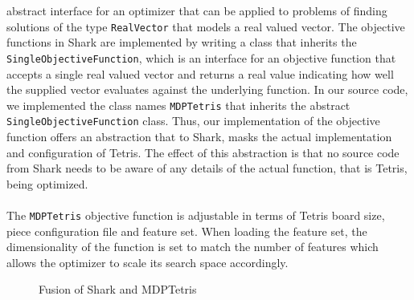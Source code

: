 abstract interface for an optimizer that can be applied to problems of finding 
solutions of the type \lstinline$RealVector$ that models a real valued vector.
The objective functions in Shark are implemented by writing a class that inherits 
the \lstinline$SingleObjectiveFunction$, which is an interface for an objective function 
that accepts a single real valued vector and returns a real value indicating how well the supplied
vector evaluates against the underlying function. In our source code, we implemented the class names 
\lstinline$MDPTetris$ that inherits the abstract \lstinline$SingleObjectiveFunction$ class.
Thus, our implementation of the objective function offers an abstraction that to Shark, masks
the actual implementation and configuration of Tetris. The effect of this abstraction is that 
no source code from Shark needs to be aware of any details of the actual function, that is Tetris, being optimized.\\
\\
The \lstinline$MDPTetris$ objective function is adjustable in terms of Tetris board size, piece 
configuration file and feature set. When loading the feature set, the dimensionality of 
the function is set to match the number of features which allows the optimizer to 
scale its search space accordingly.
\begin{figure}[h!]
\begin{center}
\end{center}
\caption{Fusion of Shark and MDPTetris}
\end{figure}



